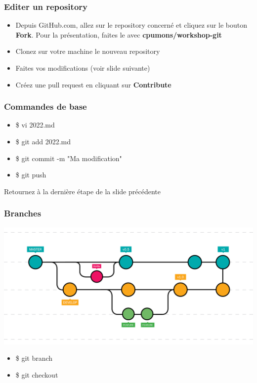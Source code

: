 \documentclass{beamer}
\begin{document}
\begin{frame}\frametitle{Editer un repository}
    \begin{itemize}
    \item Depuis GitHub.com, allez sur le repository concerné et cliquez sur le bouton \textbf{Fork}. Pour la présentation, faites le avec \textbf{cpumons/workshop-git}\\
        \item Clonez sur votre machine le nouveau repository \\
        \item Faites vos modifications (voir slide suivante) \\
        \item Créez une pull request en cliquant sur \textbf{Contribute}
    \end{itemize}
\end{frame}


\begin{frame}\frametitle{Commandes de base}
    \begin{itemize}
        \item \$ vi 2022.md
        \item \$ git add 2022.md
        \item \$ git commit -m "Ma modification"
        \item \$ git push
    \end{itemize}

    Retournez à la dernière étape de la slide précédente
\end{frame}


\begin{frame}\frametitle{Branches}
    \begin{center}
        \includegraphics[scale=0.185]{branch.png}
    \end{center}
    \begin{itemize}
        \item \$ git branch
        \item \$ git checkout
    \end{itemize}
\end{frame}
\end{document}
